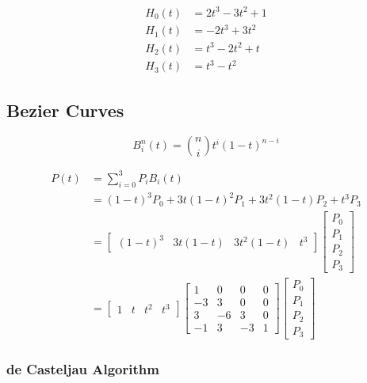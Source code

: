 \documentclass[10pt,landscape]{article}
\begin{document}
\begin{multicols}{3}
\begin{align*}
    H_0(t) &= 2t^3 - 3t^2 + 1 \\
    H_1(t) &= -2t^3 + 3t^2 \\
    H_2(t) &= t^3 - 2t^2 + t \\
    H_3(t) &= t^3 - t^2
\end{align*}

\subsection{Bezier Curves}

$$B_i^n(t) = \binom{n}{i} t^i (1-t)^{n-i}$$

\begin{align*}
    P(t) &= \sum_{i=0}^3 P_i B_i(t) \\
    &= (1-t)^3 P_0 + 3t(1-t)^2 P_1 + 3t^2(1-t) P_2 + t^3 P_3 \\
    &=  \begin{bmatrix}
            (1-t)^3 & 3t(1-t) & 3t^2(1-t) & t^3
        \end{bmatrix}
        \begin{bmatrix}
            P_0 \\
            P_1 \\
            P_2 \\
            P_3
        \end{bmatrix} \\
    &=  \begin{bmatrix}
            1 & t & t^2 & t^3
        \end{bmatrix}
        \begin{bmatrix}
            1 & 0 & 0 & 0 \\
            -3 & 3 & 0 & 0 \\
            3 & -6 & 3 & 0 \\
            -1 & 3 & -3 & 1
        \end{bmatrix}
        \begin{bmatrix}
            P_0 \\
            P_1 \\
            P_2 \\
            P_3
        \end{bmatrix}
\end{align*}

\subsubsection{de Casteljau Algorithm}


\end{multicols}
\end{document}
